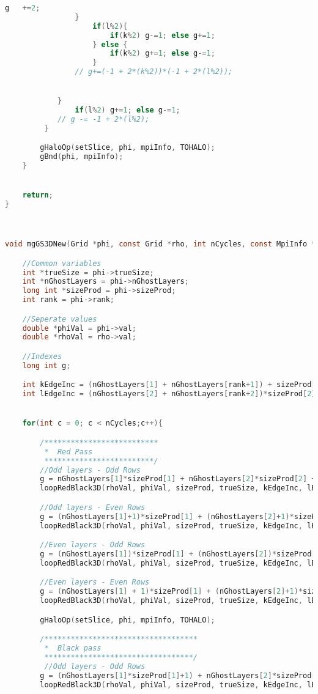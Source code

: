 \begin{lstlisting}[language=c, caption = main routine]
		 			g	+=2;
		 		}
					if(l%2){
						if(k%2)	g-=1; else g+=1;
					} else {
						if(k%2) g+=1; else g-=1;
					}
				// g+=(-1 + 2*(k%2))*(-1 + 2*(l%2));


		 	}
				if(l%2) g+=1; else g-=1;
			// g -= -1 + 2*(l%2);
		 }

		gHaloOp(setSlice, phi, mpiInfo, TOHALO);
		gBnd(phi, mpiInfo);
	}


	return;
}



void mgGS3DNew(Grid *phi, const Grid *rho, int nCycles, const MpiInfo *mpiInfo){

	//Common variables
	int *trueSize = phi->trueSize;
	int *nGhostLayers = phi->nGhostLayers;
	long int *sizeProd = phi->sizeProd;
	int rank = phi->rank;

	//Seperate values
	double *phiVal = phi->val;
	double *rhoVal = rho->val;

	//Indexes
	long int g;

	int kEdgeInc = (nGhostLayers[1] + nGhostLayers[rank+1]) + sizeProd[2];
	int lEdgeInc = (nGhostLayers[2] + nGhostLayers[rank+2])*sizeProd[2] + sizeProd[3];


	for(int c = 0; c < nCycles;c++){

		/**************************
		 *	Red Pass
		 *************************/
		//Odd layers - Odd Rows
		g = nGhostLayers[1]*sizeProd[1] + nGhostLayers[2]*sizeProd[2] + nGhostLayers[3]*sizeProd[3];
		loopRedBlack3D(rhoVal, phiVal, sizeProd, trueSize, kEdgeInc, lEdgeInc, g);

		//Odd layers - Even Rows
		g = (nGhostLayers[1]+1)*sizeProd[1] + (nGhostLayers[2]+1)*sizeProd[2] + nGhostLayers[3]*sizeProd[3];
		loopRedBlack3D(rhoVal, phiVal, sizeProd, trueSize, kEdgeInc, lEdgeInc,	g);

		//Even layers - Odd Rows
		g = (nGhostLayers[1])*sizeProd[1] + (nGhostLayers[2])*sizeProd[2] + (nGhostLayers[3]+1)*sizeProd[3];
		loopRedBlack3D(rhoVal, phiVal, sizeProd, trueSize, kEdgeInc, lEdgeInc,	g);

		//Even layers - Even Rows
		g = (nGhostLayers[1] + 1)*sizeProd[1] + (nGhostLayers[2]+1)*sizeProd[2] + (nGhostLayers[3]+1)*sizeProd[3];
		loopRedBlack3D(rhoVal, phiVal, sizeProd, trueSize, kEdgeInc, lEdgeInc,	g);

		gHaloOp(setSlice, phi, mpiInfo, TOHALO);

		/***********************************
		 *	Black pass
		 **********************************/
		 //Odd layers - Odd Rows
 		g = (nGhostLayers[1]*sizeProd[1]+1) + nGhostLayers[2]*sizeProd[2] + nGhostLayers[3]*sizeProd[3];
 		loopRedBlack3D(rhoVal, phiVal, sizeProd, trueSize, kEdgeInc, lEdgeInc,	g);


\end{lstlisting}
